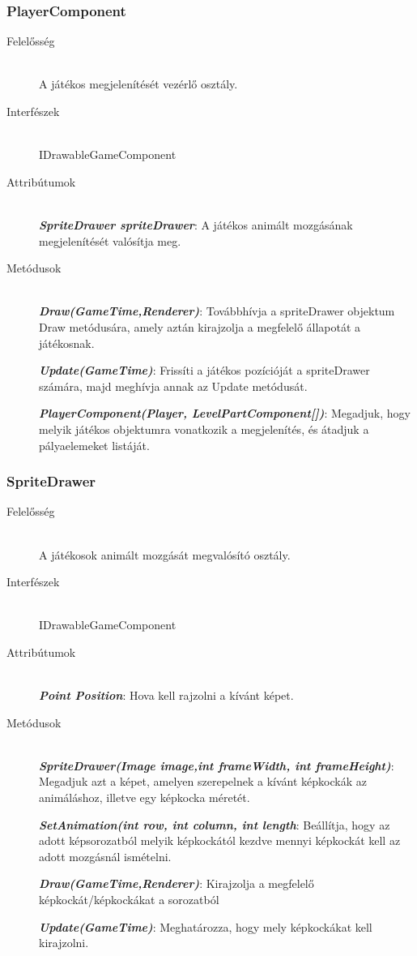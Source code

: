 \subsubsection{PlayerComponent}
	\begin{description}
		\item[Felelősség] \hfill \\
		A játékos megjelenítését vezérlő osztály.
		\item[Interfészek] \hfill \\
		IDrawableGameComponent
		\item[Attribútumok] \hfill \\
		\textbf{\emph{SpriteDrawer spriteDrawer}}: A játékos animált mozgásának megjelenítését valósítja meg.

		\item[Metódusok] \hfill \\
		\textbf{\emph{Draw(GameTime,Renderer)}}: Továbbhívja a spriteDrawer objektum Draw metódusára, amely aztán kirajzolja a megfelelő állapotát a játékosnak.

		\textbf{\emph{Update(GameTime)}}: Frissíti a játékos pozícióját a spriteDrawer számára, majd meghívja annak az Update metódusát.

		\textbf{\emph{PlayerComponent(Player, LevelPartComponent[])}}: Megadjuk, hogy melyik játékos objektumra vonatkozik a megjelenítés, és átadjuk a pályaelemeket listáját.
		
	\end{description}
	

\subsubsection{SpriteDrawer}
	\begin{description}
		\item[Felelősség] \hfill \\
		A játékosok animált mozgását megvalósító osztály.
		\item[Interfészek] \hfill \\
		IDrawableGameComponent
		\item[Attribútumok] \hfill \\
		\textbf{\emph{Point Position}}: Hova kell rajzolni a kívánt képet.

		\item[Metódusok] \hfill \\
		\textbf{\emph{SpriteDrawer(Image image,int frameWidth, int frameHeight)}}: Megadjuk azt a képet, amelyen szerepelnek a kívánt képkockák az animáláshoz, illetve egy képkocka méretét.

		\textbf{\emph{SetAnimation(int row, int column, int length}}: Beállítja, hogy az adott képsorozatból melyik képkockától kezdve mennyi képkockát kell az adott mozgásnál ismételni.

		\textbf{\emph{Draw(GameTime,Renderer)}}: Kirajzolja a megfelelő képkockát/képkockákat a sorozatból

		\textbf{\emph{Update(GameTime)}}: Meghatározza, hogy mely képkockákat kell kirajzolni.
		
	\end{description}
	
